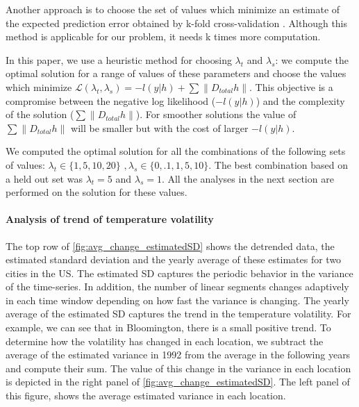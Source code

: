 \documentclass{article}
\begin{document}
Another approach is to choose the set of values which minimize an estimate of the expected prediction error obtained by k-fold cross-validation \citep{tibshirani_regression_1996} . Although this method is applicable for our problem, it needs k times more computation.

In this paper, we use a heuristic method for choosing $\lambda_t$ and $\lambda_s$: we compute the optimal solution for a range of values of these parameters and choose the values which minimize $\mathscr{L}(\lambda_t,\lambda_s)=-l(y|h)+ \sum \lVert D_{total}h \lVert$. This objective is a compromise between the negative log likelihood ($-l(y|h)$) and the complexity of the solution ($\sum \lVert D_{total}h \lVert$). For smoother solutions the value of $\sum \lVert D_{total}h \lVert$ will be smaller but with the cost of larger $-l(y|h)$.

We computed the optimal solution for all the combinations of the following sets of values: $\lambda_t \in \{1,5,10,20\} \, \, , \lambda_s \in \{0,.1,1,5,10\}$. The best combination based on a held out set was $\lambda_t=5$ and $\lambda_s=1$. All the analyses in the next section are performed on the solution for these values.


\paragraph{Analysis of trend of temperature volatility}

The top row of \autoref{fig:avg_change_estimatedSD} shows the detrended data, the estimated standard deviation and the yearly average of these estimates for two cities in the US. The estimated SD captures the periodic behavior in the variance of the time-series. In addition, the number of linear segments changes adaptively in each time window depending on how fast the variance is changing. 
The yearly average of the estimated SD captures the trend in the temperature volatility. For example, we can see that in Bloomington, there is a small positive trend. To determine how the volatility has changed in each location, we subtract the average of the estimated variance in 1992 from the average in the following years and compute their sum. The value of this change in the variance in each location is depicted in the right panel of \autoref{fig:avg_change_estimatedSD}. The left panel of this figure, shows the average estimated variance in each location.
\end{document}
